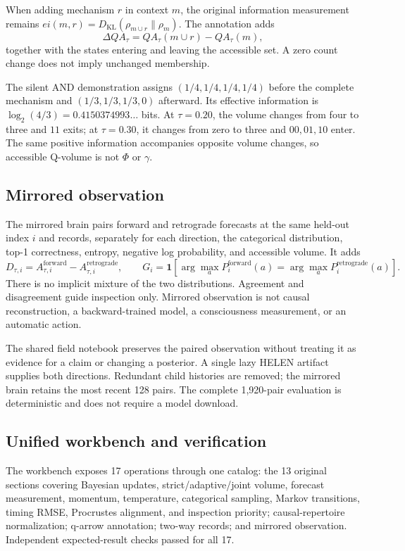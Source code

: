 \documentclass[11pt,a4paper]{article}
\begin{document}
When adding mechanism $r$ in context $m$, the original information measurement remains $ei(m,r)=D_{\mathrm{KL}}(\rho_{m\cup r}\|\rho_m)$. The annotation adds
\begin{equation}
\Delta QA_\tau=QA_\tau(m\cup r)-QA_\tau(m),
\end{equation}
together with the states entering and leaving the accessible set. A zero count change does not imply unchanged membership.

The silent AND demonstration assigns $(1/4,1/4,1/4,1/4)$ before the complete mechanism and $(1/3,1/3,1/3,0)$ afterward. Its effective information is $\log_2(4/3)=0.4150374993\ldots$ bits. At $\tau=0.20$, the volume changes from four to three and $11$ exits; at $\tau=0.30$, it changes from zero to three and $00,01,10$ enter. The same positive information accompanies opposite volume changes, so accessible Q-volume is not $\Phi$ or $\gamma$.

\subsection{Mirrored observation}
The mirrored brain pairs forward and retrograde forecasts at the same held-out index $i$ and records, separately for each direction, the categorical distribution, top-1 correctness, entropy, negative log probability, and accessible volume. It adds
\begin{equation}
D_{\tau,i}=A_{\tau,i}^{\mathrm{forward}}-A_{\tau,i}^{\mathrm{retrograde}},\qquad
G_i=\mathbf 1[\arg\max_a P^{\mathrm{forward}}_i(a)=\arg\max_a P^{\mathrm{retrograde}}_i(a)].
\end{equation}
There is no implicit mixture of the two distributions. Agreement and disagreement guide inspection only. Mirrored observation is not causal reconstruction, a backward-trained model, a consciousness measurement, or an automatic action.

The shared field notebook preserves the paired observation without treating it as evidence for a claim or changing a posterior. A single lazy HELEN artifact supplies both directions. Redundant child histories are removed; the mirrored brain retains the most recent 128 pairs. The complete 1,920-pair evaluation is deterministic and does not require a model download.

\subsection{Unified workbench and verification}
The workbench exposes 17 operations through one catalog: the 13 original sections covering Bayesian updates, strict/adaptive/joint volume, forecast measurement, momentum, temperature, categorical sampling, Markov transitions, timing RMSE, Procrustes alignment, and inspection priority; causal-repertoire normalization; q-arrow annotation; two-way records; and mirrored observation. Independent expected-result checks passed for all 17.
\end{document}
